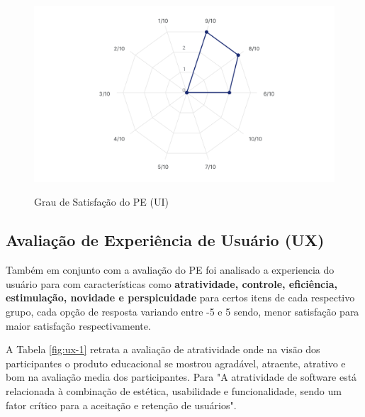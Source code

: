 \begin{figure}[h!]
    \caption{Grau de Satisfação do PE (UI)}
    \centering
    \includegraphics[scale=0.5]{figuras/resultados/satisfacao_ui.png}
    \label{fig:ui-8}
\end{figure}











\subsection{Avaliação de Experiência de Usuário (UX)}
\label{avaliacao_ux}


Também em conjunto com a avaliação do PE foi analisado a experiencia do usuário para com características como \textbf{atratividade, controle, eficiência, estimulação, novidade e perspicuidade} para certos itens de cada respectivo grupo, cada opção de resposta variando entre -5 e 5 sendo, menor satisfação para maior satisfação respectivamente.

A Tabela \ref{fig:ux-1} retrata a avaliação de atratividade onde na visão dos participantes o produto educacional se mostrou agradável, atraente, atrativo e bom na avaliação media dos participantes. Para  "A atratividade de software está relacionada à combinação de estética, usabilidade e funcionalidade, sendo um fator crítico para a aceitação e retenção de usuários".

